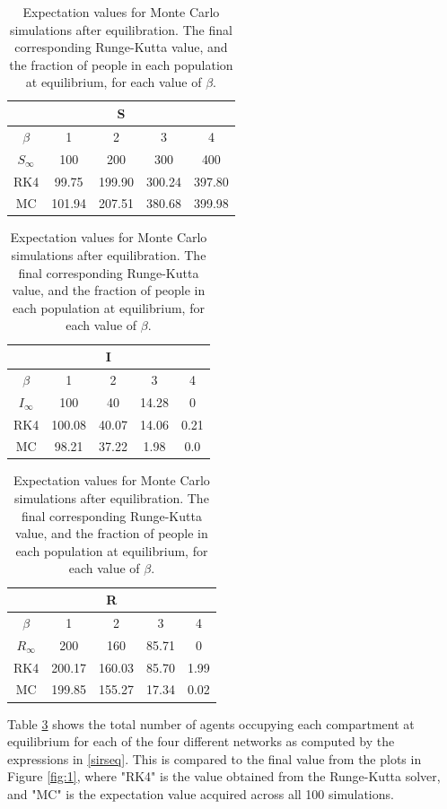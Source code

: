 \begin{table}[H]
\centering	
\begin{tabular}{|c||c|c|c|c|}
\hline
\multicolumn{5}{|c|}{S}\\
\hline
$\beta$&1&2&3&4\\
\hline\hline
$S_\infty$& 100 & 200 & 300 & 400\\
\hline
RK4& 99.75 & 199.90 & 300.24& 397.80\\
\hline
MC& 101.94 & 207.51 & 380.68 & 399.98\\
\hline
\end{tabular}
\begin{tabular}{|c||c|c|c|c|}
\hline
\multicolumn{5}{|c|}{I}\\
\hline
$\beta$&1&2&3&4\\
\hline\hline
$I_\infty$& 100 & 40 & 14.28 & 0 \\
\hline
RK4& 100.08 & 40.07 & 14.06 & 0.21\\
\hline
MC& 98.21 & 37.22 & 1.98 & 0.0\\
\hline
\end{tabular}
\begin{tabular}{|c||c|c|c|c|}
\hline
\multicolumn{5}{|c|}{R}\\
\hline
$\beta$&1&2&3&4\\
\hline\hline
$R_\infty$& 200 & 160 & 85.71 & 0\\
\hline
RK4& 200.17 & 160.03 & 85.70 & 1.99\\
\hline
MC& 199.85 & 155.27 & 17.34 & 0.02\\
\hline
\end{tabular}
\caption{Expectation values for Monte Carlo simulations after equilibration. The final corresponding Runge-Kutta value, and the fraction of people in each population at equilibrium, for each value of $\beta$.}
\label{table:2}
\end{table}

Table \ref{table:2} shows the total number of agents occupying each compartment at equilibrium for each of the four different networks as computed by the expressions in \eqref{sirseq}. This is compared to the final value from the plots in Figure \ref{fig:1}, where "RK4" is the value obtained from the Runge-Kutta solver, and "MC" is the expectation value acquired across all 100 simulations. 



